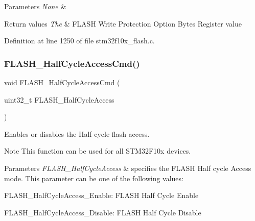 \begin{DoxyParams}{Parameters}
{\em None} & \\
\hline
\end{DoxyParams}

\begin{DoxyRetVals}{Return values}
{\em The} & F\+L\+A\+SH Write Protection Option Bytes Register value \\
\hline
\end{DoxyRetVals}


Definition at line 1250 of file stm32f10x\+\_\+flash.\+c.

\mbox{\label{group___f_l_a_s_h___private___functions_ga978103a57b37920ac01128e999f9ece6}} 
\subsubsection{\texorpdfstring{F\+L\+A\+S\+H\+\_\+\+Half\+Cycle\+Access\+Cmd()}{FLASH\_HalfCycleAccessCmd()}}
{\footnotesize\ttfamily void F\+L\+A\+S\+H\+\_\+\+Half\+Cycle\+Access\+Cmd (\begin{DoxyParamCaption}\item[{uint32\+\_\+t}]{F\+L\+A\+S\+H\+\_\+\+Half\+Cycle\+Access }\end{DoxyParamCaption})}



Enables or disables the Half cycle flash access. 

\begin{DoxyNote}{Note}
This function can be used for all S\+T\+M32\+F10x devices. 
\end{DoxyNote}

\begin{DoxyParams}{Parameters}
{\em F\+L\+A\+S\+H\+\_\+\+Half\+Cycle\+Access} & specifies the F\+L\+A\+SH Half cycle Access mode. This parameter can be one of the following values\+: \begin{DoxyItemize}
\item F\+L\+A\+S\+H\+\_\+\+Half\+Cycle\+Access\+\_\+\+Enable\+: F\+L\+A\+SH Half Cycle Enable \item F\+L\+A\+S\+H\+\_\+\+Half\+Cycle\+Access\+\_\+\+Disable\+: F\+L\+A\+SH Half Cycle Disable \end{DoxyItemize}
\\
\hline
\end{DoxyParams}

